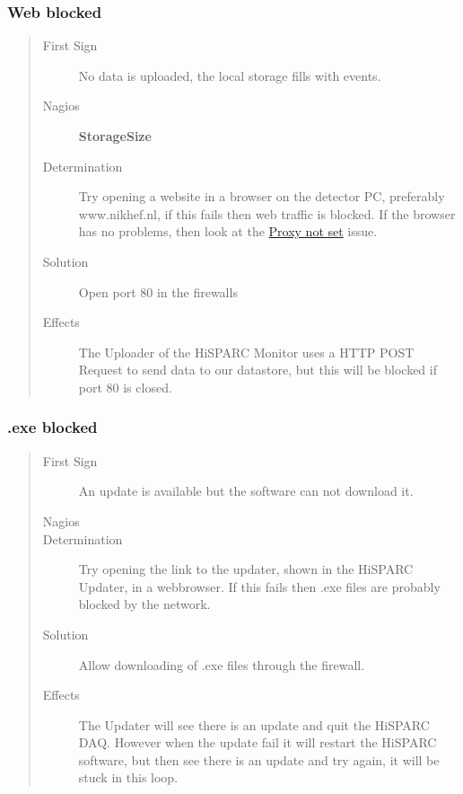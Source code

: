 \documentclass[a4paper,11pt,english]{sphinxmanual}
\begin{document}
\subsubsection{Web blocked}
\label{known-issues:web-blocked}\begin{quote}\begin{description}
\item[{First Sign}] \leavevmode
No data is uploaded, the local storage fills with events.

\item[{Nagios}] \leavevmode
\textbf{StorageSize}

\item[{Determination}] \leavevmode
Try opening a website in a browser on the detector PC,
preferably www.nikhef.nl, if this fails then web traffic
is blocked. If the browser has no problems, then look at
the {\hyperref[known-issues:proxy-not-set]{Proxy not set}} issue.

\item[{Solution}] \leavevmode
Open port 80 in the firewalls

\item[{Effects}] \leavevmode
The Uploader of the HiSPARC Monitor uses a HTTP POST Request
to send data to our datastore, but this will be blocked if
port 80 is closed.

\end{description}\end{quote}


\subsubsection{.exe blocked}
\label{known-issues:exe-blocked}\begin{quote}\begin{description}
\item[{First Sign}] \leavevmode
An update is available but the software can not download it.

\item[{Nagios}] \leavevmode
\item[{Determination}] \leavevmode
Try opening the link to the updater, shown in the
HiSPARC Updater, in a webbrowser. If this fails then
.exe files are probably blocked by the network.

\item[{Solution}] \leavevmode
Allow downloading of .exe files through the firewall.

\item[{Effects}] \leavevmode
The Updater will see there is an update and quit the HiSPARC
DAQ. However when the update fail it will restart the
HiSPARC software, but then see there is an update and try
again, it will be stuck in this loop.

\end{description}\end{quote}
\end{document}
